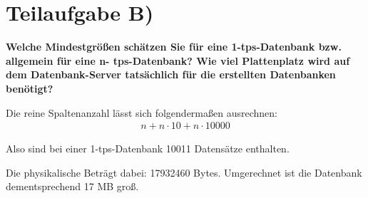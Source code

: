 \section{Teilaufgabe B)}
\textbf{Welche Mindestgrößen schätzen Sie für eine 1-tps-Datenbank bzw. allgemein für eine n-
tps-Datenbank? Wie viel Plattenplatz wird auf dem Datenbank-Server tatsächlich für die
erstellten Datenbanken benötigt?}

Die reine Spaltenanzahl lässt sich folgendermaßen ausrechnen:
\begin{eqnarray}
n + n \cdot 10 + n \cdot 10000
\end{eqnarray}

Also sind bei einer 1-tps-Datenbank 10011 Datensätze enthalten.

Die physikalische Beträgt dabei: 17932460 Bytes. \newline
Umgerechnet ist die Datenbank dementsprechend 17 MB groß.
\clearpage